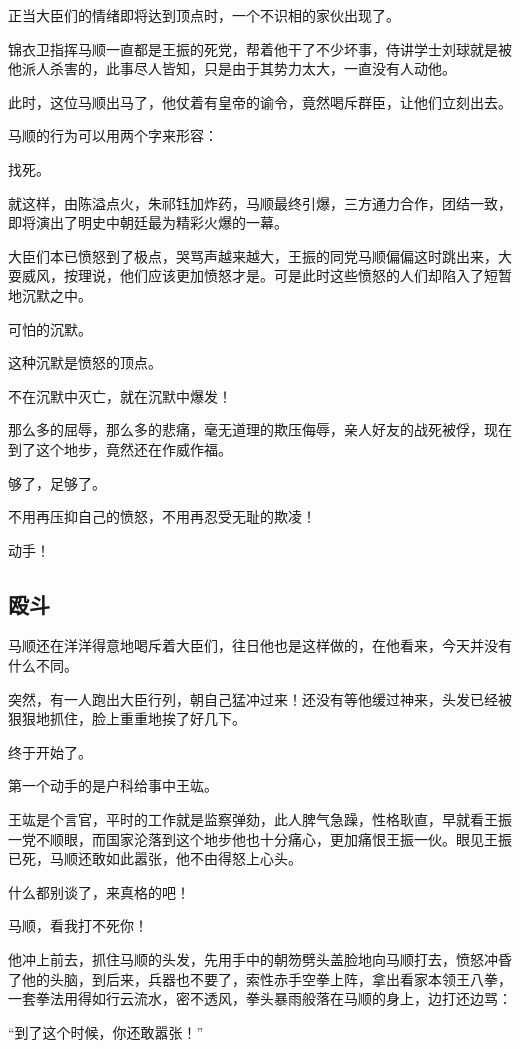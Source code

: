 \begin{multicols}{\theparacolNo}
正当大臣们的情绪即将达到顶点时，一个不识相的家伙出现了。

锦衣卫指挥马顺一直都是王振的死党，帮着他干了不少坏事，侍讲学士刘球就是被他派人杀害的，此事尽人皆知，只是由于其势力太大，一直没有人动他。

此时，这位马顺出马了，他仗着有皇帝的谕令，竟然喝斥群臣，让他们立刻出去。

马顺的行为可以用两个字来形容：

找死。

就这样，由陈溢点火，朱祁钰加炸药，马顺最终引爆，三方通力合作，团结一致，即将演出了明史中朝廷最为精彩火爆的一幕。

大臣们本已愤怒到了极点，哭骂声越来越大，王振的同党马顺偏偏这时跳出来，大耍威风，按理说，他们应该更加愤怒才是。可是此时这些愤怒的人们却陷入了短暂地沉默之中。

可怕的沉默。

这种沉默是愤怒的顶点。

不在沉默中灭亡，就在沉默中爆发！

那么多的屈辱，那么多的悲痛，毫无道理的欺压侮辱，亲人好友的战死被俘，现在到了这个地步，竟然还在作威作福。

够了，足够了。

不用再压抑自己的愤怒，不用再忍受无耻的欺凌！

动手！

\subsection{殴斗}
马顺还在洋洋得意地喝斥着大臣们，往日他也是这样做的，在他看来，今天并没有什么不同。

突然，有一人跑出大臣行列，朝自己猛冲过来！还没有等他缓过神来，头发已经被狠狠地抓住，脸上重重地挨了好几下。

终于开始了。

第一个动手的是户科给事中王竑。

王竑是个言官，平时的工作就是监察弹劾，此人脾气急躁，性格耿直，早就看王振一党不顺眼，而国家沦落到这个地步他也十分痛心，更加痛恨王振一伙。眼见王振已死，马顺还敢如此嚣张，他不由得怒上心头。

什么都别谈了，来真格的吧！

马顺，看我打不死你！

他冲上前去，抓住马顺的头发，先用手中的朝笏劈头盖脸地向马顺打去，愤怒冲昏了他的头脑，到后来，兵器也不要了，索性赤手空拳上阵，拿出看家本领王八拳，一套拳法用得如行云流水，密不透风，拳头暴雨般落在马顺的身上，边打还边骂：

“到了这个时候，你还敢嚣张！”


\end{multicols}
